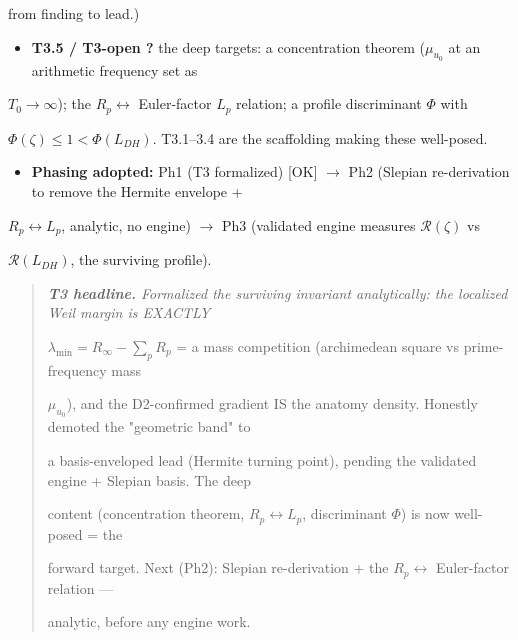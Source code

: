 \documentclass[10pt]{article}
\begin{document}
  from finding to lead.)\par
\begin{itemize}
\item \textbf{T3.5 / T3-open ?} the deep targets: a concentration theorem ($\mu_{u_0}$ at an arithmetic frequency set as
\end{itemize}
  $T_0\to\infty$); the $R_p\leftrightarrow$ Euler-factor $L_p$ relation; a profile discriminant $\Phi$ with\par
  $\Phi(\zeta)\le1<\Phi(L_{DH})$. T3.1--3.4 are the scaffolding making these well-posed.\par
\begin{itemize}
\item \textbf{Phasing adopted:} Ph1 (T3 formalized) [OK] \ensuremath{\to} Ph2 (Slepian re-derivation to remove the Hermite envelope +
\end{itemize}
  $R_p\leftrightarrow L_p$, analytic, no engine) \ensuremath{\to} Ph3 (validated engine measures $\mathcal R(\zeta)$ vs\par
  $\mathcal R(L_{DH})$, the surviving profile).\par

\begin{quote}\itshape
\textbf{T3 headline.} Formalized the surviving invariant analytically: the localized Weil margin is EXACTLY\par
$\lambda_{\min}=R_\infty-\sum_p R_p$ = a mass competition (archimedean square vs prime-frequency mass\par
$\mu_{u_0}$), and the D2-confirmed gradient IS the anatomy density. Honestly demoted the "geometric band" to\par
a basis-enveloped lead (Hermite turning point), pending the validated engine + Slepian basis. The deep\par
content (concentration theorem, $R_p\leftrightarrow L_p$, discriminant $\Phi$) is now well-posed = the\par
forward target. Next (Ph2): Slepian re-derivation + the $R_p\leftrightarrow$ Euler-factor relation ---\par
analytic, before any engine work.\par
\end{quote}
\end{document}

